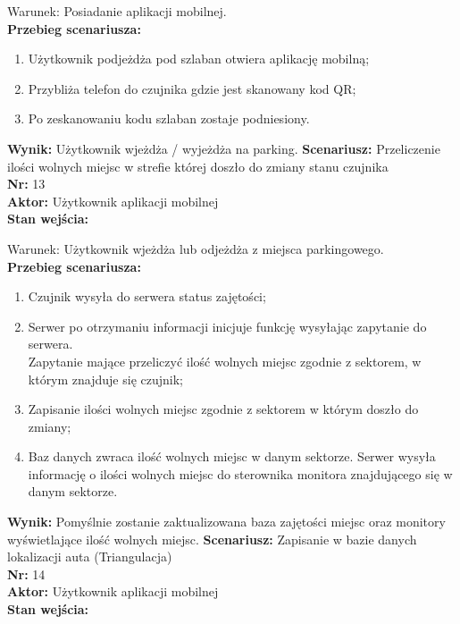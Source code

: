 \documentclass[12pt,a4paper]{article}
\begin{document}
Warunek: Posiadanie aplikacji mobilnej.
\\{\bf Przebieg scenariusza:}
\begin{enumerate}
\item Użytkownik podjeżdża pod szlaban otwiera aplikację mobilną;
\item Przybliża telefon do czujnika gdzie jest skanowany kod QR;
\item Po zeskanowaniu kodu szlaban zostaje podniesiony.
\end{enumerate}
{\bf Wynik:} Użytkownik wjeżdża / wyjeżdża na parking.
\newline\newline
{\large \bf Scenariusz:} Przeliczenie ilości wolnych miejsc w strefie której doszło do zmiany stanu czujnika
\\{\bf Nr:} 13
\\{\bf Aktor:} Użytkownik aplikacji mobilnej
\\{\bf Stan wejścia:}

Warunek: Użytkownik wjeżdża lub odjeżdża z miejsca parkingowego.
\\{\bf Przebieg scenariusza:}
\begin{enumerate}
\item Czujnik wysyła do serwera status zajętości;
\item Serwer po otrzymaniu informacji inicjuje funkcję wysyłając zapytanie do serwera.\\Zapytanie mające przeliczyć ilość wolnych miejsc zgodnie z sektorem, w którym znajduje się czujnik;
\item Zapisanie ilości wolnych miejsc zgodnie z sektorem w którym doszło do zmiany;
\item Baz danych zwraca ilość wolnych miejsc w danym sektorze. Serwer wysyła informację o ilości wolnych miejsc do sterownika monitora znajdującego się w danym sektorze.
\end{enumerate}
{\bf Wynik:} Pomyślnie zostanie zaktualizowana baza zajętości miejsc oraz monitory\\wyświetlające ilość wolnych miejsc.
\newline\newline\newline\newline\newline\newline\newline\newline\newline\newline\newline\newline\newline\newline
{\large \bf Scenariusz:} Zapisanie w bazie danych lokalizacji auta (Triangulacja)
\\{\bf Nr:} 14
\\{\bf Aktor:} Użytkownik aplikacji mobilnej
\\{\bf Stan wejścia:}
\end{document}
